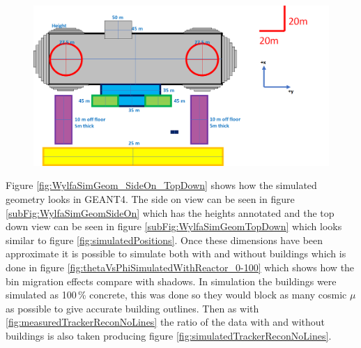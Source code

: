 \begin{figure}[htbp]
 \centering
 \includegraphics[width=\linewidth]{Chapter5/Figs/wylfaRasterNew/simulatedHeights.png}
 \label{fig:simulatedHeights}
\end{figure}

Figure \ref{fig:WylfaSimGeom_SideOn_TopDown} shows how the simulated geometry looks in  GEANT4. The side on view can be seen in figure \ref{subFig:WylfaSimGeomSideOn} which has the heights annotated and the top down view can be seen in figure \ref{subFig:WylfaSimGeomTopDown} which looks similar to figure \ref{fig:simulatedPositions}. Once these dimensions have been approximate it is possible to simulate both with and without buildings which is done in figure
\ref{fig:thetaVsPhiSimulatedWithReactor_0-100} which shows how the bin migration effects compare with shadows. In simulation the buildings were simulated as 100\,\% concrete, this was done so they would block as many cosmic $\mu$ as possible to give accurate building outlines. Then as with \ref{fig:measuredTrackerReconNoLines} the ratio of the data with and without buildings is also taken  producing figure \ref{fig:simulatedTrackerReconNoLines}. 

